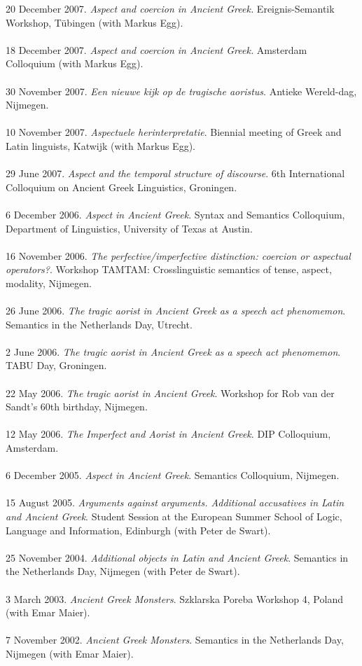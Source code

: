 \documentclass[a4paper,11pt]{article}
\begin{document}
20 December 2007. \emph{Aspect and coercion in Ancient Greek.} Ereignis-Semantik Workshop, T\"ubingen (with Markus Egg).\\\\
18 December 2007. \emph{Aspect and coercion in Ancient Greek.} Amsterdam Colloquium (with Markus Egg).\\\\ 
30 November 2007. \emph{Een nieuwe kijk op de tragische aoristus}. Antieke Wereld-dag, Nijmegen.\\\\
10 November 2007. \emph{Aspectuele herinterpretatie}. Biennial meeting of Greek and Latin linguists, Katwijk (with Markus Egg).\\\\
29 June 2007. \emph{Aspect and the temporal structure of discourse}. 6th International Colloquium on Ancient Greek Linguistics, Groningen.\\\\
6 December 2006. \emph{Aspect in Ancient Greek}. Syntax and Semantics Colloquium, Department of Linguistics, University of Texas at Austin.\\\\
16 November 2006. \emph{The perfective/imperfective distinction: coercion or aspectual operators?}. Workshop TAMTAM: Crosslinguistic semantics of tense, aspect, modality, Nijmegen.\\\\
26 June 2006. \emph{The tragic aorist in Ancient Greek as a speech act phenomemon}. Semantics in the Netherlands Day, Utrecht.\\\\
2 June 2006. \emph{The tragic aorist in Ancient Greek as a speech act phenomemon}. TABU Day, Groningen.\\\\
22 May 2006. \emph{The tragic aorist in Ancient Greek}. Workshop for Rob van der Sandt's 60th birthday, Nijmegen.\\\\
12 May 2006. \emph{The Imperfect and Aorist in Ancient Greek}. DIP Colloquium, Amsterdam.\\\\
6 December 2005. \emph{Aspect in Ancient Greek}. Semantics Colloquium, Nijmegen.\\\\
15 August 2005. \emph{Arguments against arguments. Additional
accusatives in Latin and Ancient Greek}. Student Session at the
European Summer School of Logic, Language and Information,
Edinburgh (with Peter de Swart).\\\\
25 November 2004. \emph{Additional objects in Latin and Ancient
Greek}. Semantics in the Netherlands Day, Nijmegen (with Peter de Swart).\\\\
3 March 2003. \emph{Ancient Greek Monsters}. Szklarska
Poreba Workshop 4, Poland (with Emar Maier).\\\\
7 November 2002. \emph{Ancient Greek Monsters}. Semantics in the Netherlands Day, Nijmegen (with Emar
Maier).\\
\end{document}
